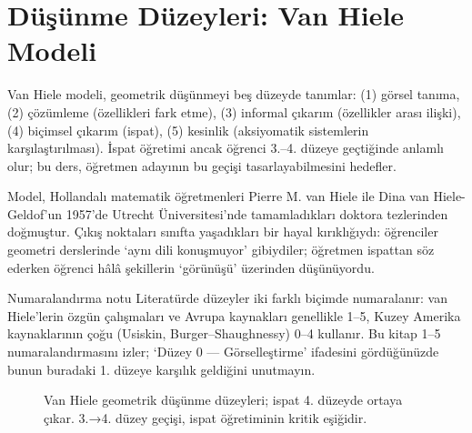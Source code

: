 \section{Düşünme Düzeyleri: Van Hiele Modeli}

Van Hiele modeli, geometrik düşünmeyi beş düzeyde tanımlar: (1) görsel tanıma, (2) çözümleme (özellikleri fark etme), (3) informal çıkarım (özellikler arası ilişki), (4) biçimsel çıkarım (ispat), (5) kesinlik (aksiyomatik sistemlerin karşılaştırılması). İspat öğretimi ancak öğrenci 3.–4. düzeye geçtiğinde anlamlı olur; bu ders, öğretmen adayının bu geçişi tasarlayabilmesini hedefler.

Model, Hollandalı matematik öğretmenleri Pierre M. van Hiele ile Dina van Hiele-Geldof’un 1957’de Utrecht Üniversitesi’nde tamamladıkları doktora tezlerinden doğmuştur. Çıkış noktaları sınıfta yaşadıkları bir hayal kırıklığıydı: öğrenciler geometri derslerinde ‘aynı dili konuşmuyor’ gibiydiler; öğretmen ispattan söz ederken öğrenci hâlâ şekillerin ‘görünüşü’ üzerinden düşünüyordu.

\begin{tbox}{Numaralandırma notu}
Literatürde düzeyler iki farklı biçimde numaralanır: van Hiele’lerin özgün çalışmaları ve Avrupa kaynakları genellikle 1–5, Kuzey Amerika kaynaklarının çoğu (Usiskin, Burger–Shaughnessy) 0–4 kullanır. Bu kitap 1–5 numaralandırmasını izler; ‘Düzey 0 — Görselleştirme’ ifadesini gördüğünüzde bunun buradaki 1. düzeye karşılık geldiğini unutmayın.
\end{tbox}

\begin{figure}[h]
\centering
{}%
\caption{Van Hiele geometrik düşünme düzeyleri; ispat 4. düzeyde ortaya çıkar. 3.→4. düzey geçişi, ispat öğretiminin kritik eşiğidir.}
\end{figure}

